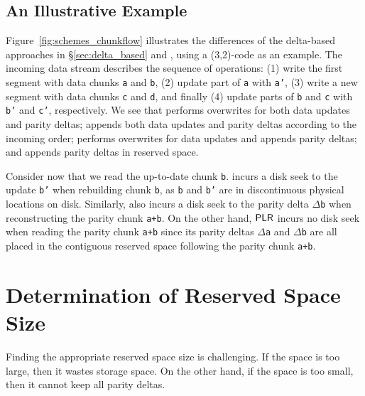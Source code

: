 \subsection{An Illustrative Example} 

Figure~\ref{fig:schemes_chunkflow} illustrates the differences of the
delta-based approaches in \S\ref{sec:delta_based} and \PLR, using a
(3,2)-code as an example.  The incoming data stream describes the sequence of
operations: (1) write the first segment with data chunks \texttt{a} and
\texttt{b}, (2) update part of \texttt{a} with \texttt{a'}, (3) write a new
segment with data chunks \texttt{c} and \texttt{d}, and finally (4) update parts
of \texttt{b} and \texttt{c} with \texttt{b'} and \texttt{c'}, respectively.  We
see that \FO performs overwrites for both data updates and parity deltas; \FL
appends both data updates and parity deltas according to the incoming order; \PL
performs overwrites for data updates and appends parity deltas; and \PLR appends
parity deltas in reserved space. 

Consider now that we read the up-to-date chunk \texttt{b}.  \FL incurs a disk
seek to the update \texttt{b'} when rebuilding chunk \texttt{b}, as 
\texttt{b} and \texttt{b'} are in discontinuous physical locations on
disk.  Similarly, \PL also incurs a disk seek to the parity delta
\texttt{$\Delta$b} when reconstructing the parity chunk \texttt{a+b}. On the
other hand,  $\textsf{PLR}$ incurs no disk seek when reading the parity chunk 
\texttt{a+b} since its parity deltas \texttt{$\Delta$a} and \texttt{$\Delta$b} are all placed
in the contiguous reserved space following the parity chunk \texttt{a+b}. 

\section{Determination of Reserved Space Size}
\label{sec:reserve_strategies}

Finding the appropriate reserved space size is challenging.  If the space is
too large, then it wastes storage space.   On the other hand, if the space is
too small, then it cannot keep all parity deltas.  


